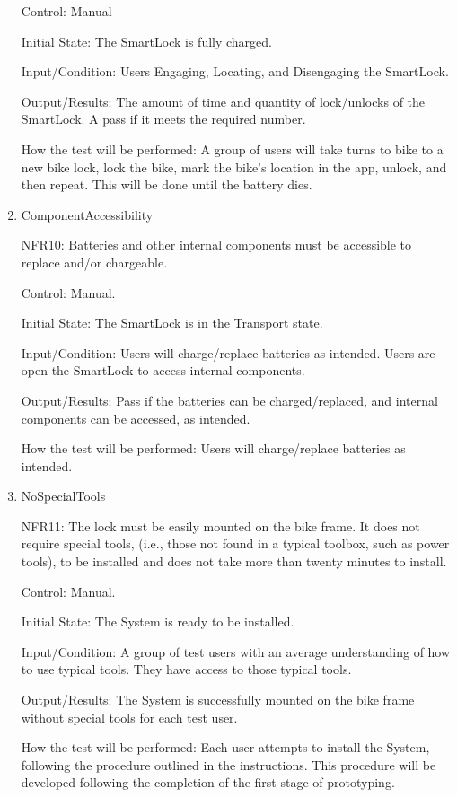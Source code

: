\documentclass[12pt, titlepage]{article}
\begin{document}
\begin{enumerate}
Control: Manual 

Initial State: The SmartLock is fully charged.

Input/Condition: Users Engaging, Locating, and Disengaging the SmartLock.

Output/Results: The amount of time and quantity of lock/unlocks of the SmartLock. A pass if it meets the required number.

How the test will be performed:  A group of users will take turns to bike to a new bike lock, lock the bike, mark the bike's location in the app, unlock, and then repeat. This will be done until the battery dies.

\item{ComponentAccessibility

NFR10: Batteries and other internal components must be accessible to replace and/or chargeable. }

Control: Manual.

Initial State: The SmartLock is in the Transport state.

Input/Condition: Users will charge/replace batteries as intended. Users are open the SmartLock to access internal components.

Output/Results: Pass if the batteries can be charged/replaced, and internal components can be accessed, as intended.

How the test will be performed: Users will charge/replace batteries as intended.

\item{NoSpecialTools

NFR11: The lock must be easily mounted on the bike frame. It does not require special tools, (i.e., those not found in a typical toolbox, such as power tools), to be installed and does not take more than twenty minutes to install. }

Control: Manual.

Initial State: The System is ready to be installed.  

Input/Condition: A group of test users with an average understanding of how to use typical tools. They have access to those typical tools. 

Output/Results: The System is successfully mounted on the bike frame without special tools for each test user. 

How the test will be performed: Each user attempts to install the System, following the procedure outlined in the instructions. This procedure will be developed following the completion of the first stage of prototyping. 


\end{enumerate}
\end{document}
